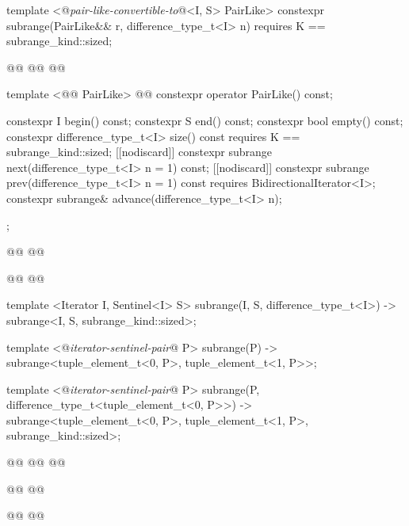 \begin{codeblock}
{{{{{    template <@\textit{pair-like-convertible-to}@<I, S> PairLike>
    constexpr subrange(PairLike&& r, difference_type_t<I> n)
      requires K == subrange_kind::sized;

    @@
      @@
    @@

    template <@@ PairLike>
      @@
    constexpr operator PairLike() const;

    constexpr I begin() const;
    constexpr S end() const;
    constexpr bool empty() const;
    constexpr difference_type_t<I> size() const
      requires K == subrange_kind::sized;
    [[nodiscard]] constexpr subrange next(difference_type_t<I> n = 1) const;
    [[nodiscard]] constexpr subrange prev(difference_type_t<I> n = 1) const
      requires BidirectionalIterator<I>;
    constexpr subrange& advance(difference_type_t<I> n);
  };

  @@
    @@

  @@
    @@

  template <Iterator I, Sentinel<I> S>
  subrange(I, S, difference_type_t<I>) -> subrange<I, S, subrange_kind::sized>;

  template <@\textit{iterator-sentinel-pair}@ P>
  subrange(P) ->
    subrange<tuple_element_t<0, P>, tuple_element_t<1, P>>;

  template <@\textit{iterator-sentinel-pair}@ P>
  subrange(P, difference_type_t<tuple_element_t<0, P>>) ->
    subrange<tuple_element_t<0, P>, tuple_element_t<1, P>, subrange_kind::sized>;

  @@
  @@
    @@

  @@
  @@

  @@
  @@

}}}}
\end{codeblock}
